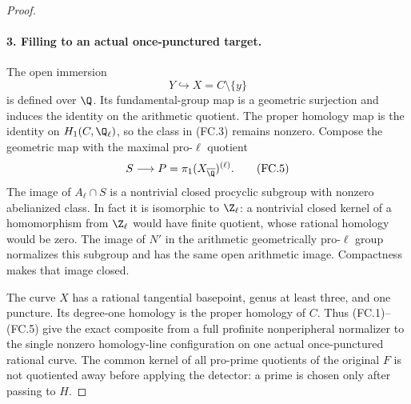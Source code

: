 \begin{proof}
\paragraph{3. Filling to an actual once-punctured target.}
The open immersion
\[
                         Y\hookrightarrow X=C\setminus\{y\}
                                                               \tag{FC.4}
\]
is defined over $\Q$. Its fundamental-group map
is a geometric surjection and induces the
identity on the arithmetic quotient. The
proper homology map is the identity on
$H_1(C,\Q_\ell)$, so the class in (FC.3)
remains nonzero. Compose the geometric map
with the maximal pro-$\ell$ quotient
\[
                     S\longrightarrow
                     P=\pi_1(X_{\overline\Q})^{(\ell)}.
                                                               \tag{FC.5}
\]
The image of $A_\ell\cap S$ is a nontrivial
closed procyclic subgroup with nonzero
abelianized class. In fact it is isomorphic
to $\Z_\ell$: a nontrivial closed kernel of
a homomorphism from $\Z_\ell$ would have
finite quotient, whose rational homology
would be zero. The image of $N'$ in the
arithmetic geometrically pro-$\ell$ group
normalizes this subgroup and has the same
open arithmetic image. Compactness makes
that image closed.

The curve $X$ has a rational tangential
basepoint, genus at least three, and one
puncture. Its degree-one homology is the
proper homology of $C$. Thus (FC.1)--(FC.5)
give the exact composite from a full
profinite nonperipheral normalizer to the
single nonzero homology-line configuration
on one actual once-punctured rational curve.
The common kernel of all pro-prime quotients
of the original $F$ is not quotiented away
before applying the detector: a prime is
chosen only after passing to $H$.


\end{proof}
